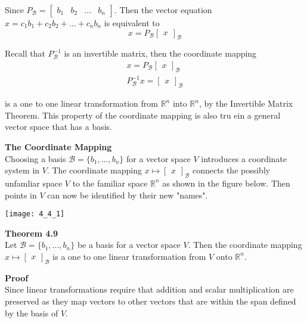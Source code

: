 \documentclass{article}
\begin{document}
  Since $ P_\mathcal{B}=\begin{bmatrix}
    b_1 &b_2 &... &b_n
  \end{bmatrix} $. Then the vector equation $ x=c_1b_1+c_2b_2+...+c_nb_n $ is equivalent to
  \[
    x=P_\mathcal{B}\begin{bmatrix}
      x
    \end{bmatrix}_\mathcal{B}
  \]

  Recall that $ P_\mathcal{B}^{-1} $ is an invertible matrix, then the coordinate mapping
  \[
    \begin{gathered}
    x=P_\mathcal{B}\begin{bmatrix}
      x
    \end{bmatrix}_\mathcal{B}\\
    P^{-1}_\mathcal{B}x=\begin{bmatrix}
      x
    \end{bmatrix}_\mathcal{B}
    \end{gathered}
  \]

  is a one to one linear transformation from $ \mathbb{R}^{n} $ into $ \mathbb{R}^{n} $, by the Invertible Matrix Theorem. This property of the coordinate mapping is also tru ein a general vector space that has a basis.

  \textbf{The Coordinate Mapping}\\
  Choosing a basis $ \mathcal{B}=\{ b_1,...,b_n \} $ for a vector space $ V $ introduces a coordinate system in $ V $. The coordinate mapping $ x \mapsto \begin{bmatrix}
    x
  \end{bmatrix}_\mathcal{B} $ connects the possibly unfamliar space $ V $ to the familiar space $ \mathbb{R}^{n} $ as shown in the figure below. Then points in $ V $ can now be identified by their new "names". 

  \begin{center}
    \texttt{[image: 4\_4\_1]}
  \end{center}

  \textbf{Theorem 4.9}\\
  Let $ \mathcal{B}=\{ b_1,...,b_n \} $ be a basis for a vector space $ V $. Then the coordinate mapping $ x \mapsto \begin{bmatrix}
    x
  \end{bmatrix}_\mathcal{B} $ is a one to one linear transformation from $ V $ onto $ \mathbb{R}^{n} $. 
  
  \textbf{Proof}\\
  Since linear transformations require that addition and scalar multiplication are preserved as they map vectors to other vectors that are within the span defined by the basis of $ V $. 
\end{document}
